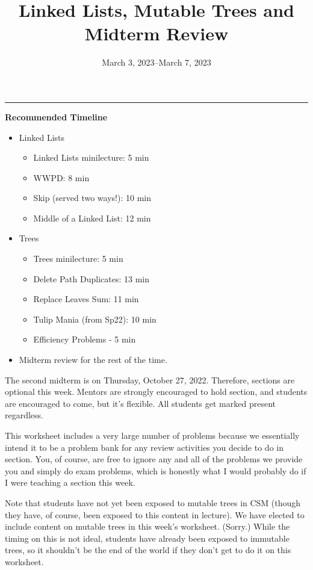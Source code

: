 \documentclass{exam}
\title{Linked Lists, Mutable Trees and Midterm Review}
\date{March 3, 2023--March 7, 2023}
\begin{document}
\maketitle
\rule{\textwidth}{0.15em}

\begin{meta}
    \textbf{Recommended Timeline}
    \begin{itemize}
        \item Linked Lists
        \begin{itemize}
            \item Linked Lists minilecture: 5 min
            \item WWPD: 8 min
            \item Skip (served two ways!): 10 min
            \item Middle of a Linked List: 12 min
        \end{itemize}
        \item Trees
        \begin{itemize}
            \item Trees minilecture: 5 min
            \item Delete Path Duplicates: 13 min
            \item Replace Leaves Sum: 11 min
            \item Tulip Mania (from Sp22): 10 min
            \item Efficiency Problems - 5 min
        \end{itemize}
        \item Midterm review for the rest of the time. 
    \end{itemize}

    The second midterm is on Thursday, October 27, 2022. Therefore, sections are optional this week. Mentors are strongly encouraged to hold section, and students are encouraged to come, but it's flexible. All students get marked present regardless. 
    
    This worksheet includes a very large number of problems because we essentially intend it to be a problem bank for any review activities you decide to do in section. You, of course, are free to ignore any and all of the problems we provide you and simply do exam problems, which is honestly what I would probably do if I were teaching a section this week. 

    Note that students have not yet been exposed to mutable trees in CSM (though they have, of course, been exposed to this content in lecture). We have elected to include content on mutable trees in this week's worksheet. (Sorry.) While the timing on this is not ideal, students have already been exposed to immutable trees, so it shouldn't be the end of the world if they don't get to do it on this worksheet. 
\end{meta}
\end{document}
